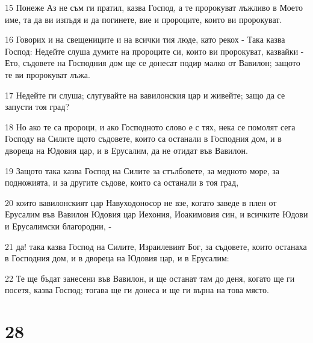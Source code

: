 \par 15 Понеже Аз не съм ги пратил, казва Господ, а те пророкуват лъжливо в Моето име, та да ви изпъдя и да погинете, вие и пророците, които ви пророкуват.
\par 16 Говорих и на свещениците и на всички тия люде, като рекох - Така казва Господ: Недейте слуша думите на пророците си, които ви пророкуват, казвайки - Ето, съдовете на Господния дом ще се донесат подир малко от Вавилон; защото те ви пророкуват лъжа.
\par 17 Недейте ги слуша; слугувайте на вавилонския цар и живейте; защо да се запусти тоя град?
\par 18 Но ако те са пророци, и ако Господното слово е с тях, нека се помолят сега Господу на Силите щото съдовете, които са останали в Господния дом, и в двореца на Юдовия цар, и в Ерусалим, да не отидат във Вавилон.
\par 19 Защото така казва Господ на Силите за стълбовете, за медното море, за подножията, и за другите съдове, които са останали в тоя град,
\par 20 които вавилонският цар Навуходоносор не взе, когато заведе в плен от Ерусалим във Вавилон Юдовия цар Иехония, Иоакимовия син, и всичките Юдови и Ерусалимски благородни, -
\par 21 да! така казва Господ на Силите, Израилевият Бог, за съдовете, които останаха в Господния дом, и в двореца на Юдовия цар, и в Ерусалим:
\par 22 Те ще бъдат занесени във Вавилон, и ще останат там до деня, когато ще ги посетя, казва Господ; тогава ще ги донеса и ще ги върна на това място.

\chapter{28}

